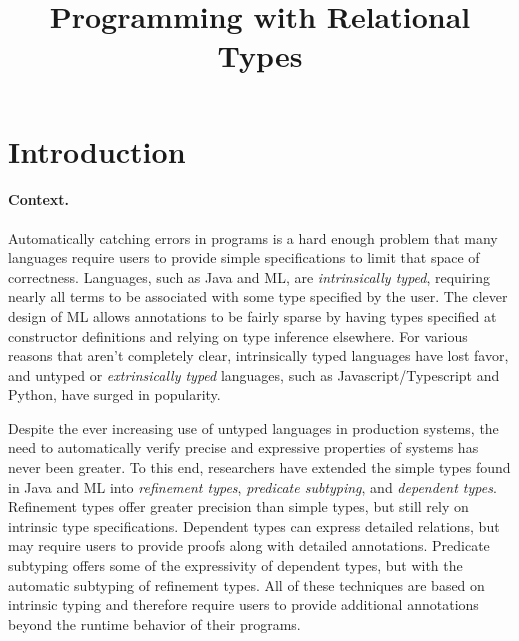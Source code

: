 \documentclass[acmsmall]{acmart}
\title{Programming with Relational Types}
\begin{document}
\newcommand{\code}[1]{\texttt{#1}}
\newcommand{\claim}{\ \vdash\ }
\newcommand{\hastype}{\ \ddagger\ }
\newcommand{\subtypes}{\ \sqsubseteq\ }
\newcommand{\I}{\hspace{4mm}}
\newcommand{\B}[1]{\textbf{#1}}
\newcommand{\F}[1]{\text{#1}}
\newcommand{\bigand}{\bigwedge\nolimits}
\newcommand{\C}[1]{\color{teal} \rhd\ \emph{#1}}
\newcommand{\FIG}[1]{Fig. {\color{red} \ref{#1}}}
     



\maketitle


\section{Introduction}

\paragraph{Context.} 
Automatically catching errors in programs is a hard enough problem
that many languages require users to provide simple specifications to limit that space of correctness.
Languages, such as Java and ML, are \textit{intrinsically typed}, 
requiring nearly all terms to be associated with some type specified by the user. 
The clever design of ML allows annotations to be fairly sparse by 
having types specified at constructor definitions and relying on type inference elsewhere.
For various reasons that aren't completely clear, intrinsically typed languages have lost favor,
and untyped or \textit{extrinsically typed} languages, 
such as Javascript/Typescript and Python, have surged in popularity. 

Despite the ever increasing use of untyped languages in production systems, 
the need to automatically verify precise and expressive properties of systems has never been greater.
To this end, researchers have extended the simple types found in Java and ML into 
\textit{refinement types}, \textit{predicate subtyping}, and \textit{dependent types}. 
Refinement types offer greater precision than simple types, but still rely on intrinsic type specifications.
Dependent types can express detailed relations, but may require users to provide proofs along with detailed annotations.
Predicate subtyping offers some of the expressivity of dependent types, but with the automatic subtyping of refinement types.
All of these techniques are based on intrinsic typing and therefore require users to provide additional annotations
beyond the runtime behavior of their programs.
\end{document}
